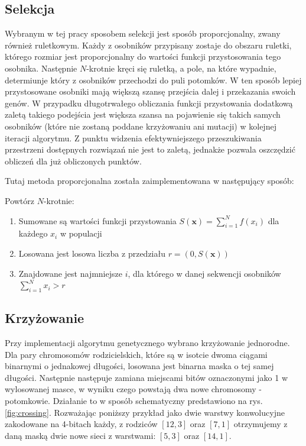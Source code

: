 \subsection{Selekcja}
Wybranym w tej pracy sposobem selekcji jest sposób proporcjonalny, zwany również ruletkowym.
Każdy z osobników przypisany zostaje do obszaru ruletki, którego rozmiar jest proporcjonalny do wartości funkcji przystosowania tego osobnika.
Następnie $N$-krotnie kręci się ruletką, a pole, na które wypadnie, determiunje który z osobników przechodzi do puli potomków.
W ten sposób lepiej przystosowane osobniki mają większą szansę przejścia dalej i przekazania swoich genów.
W przypadku długotrwałego obliczania funkcji przystowania dodatkową zaletą takiego podejścia jest większa szansa na pojawienie się takich samych osobników (które nie zostaną poddane krzyżowaniu ani mutacji) w kolejnej iteracji algorytmu.
Z punktu widzenia efektywniejszego przeszukiwania przestrzeni dostępnych rozwiązań nie jest to zaletą, jednakże pozwala oszczędzić obliczeń dla już obliczonych punktów.

Tutaj metoda proporcjonalna została zaimplementowana w następujący sposób:

Powtórz $N$-krotnie:
\begin{enumerate}
  \item Sumowane są wartości funkcji przystowania $S(\mathbf{x})=\sum_{i=1}^{N}f(x_i)$ dla każdego $x_i$ w populacji
  \item Losowana jest losowa liczba z przedziału $r = (0,S(\mathbf{x}))$
  \item Znajdowane jest najmniejsze $i$, dla którego w danej sekwencji osobników $\sum_{i=1}^{N}x_i > r $
\end{enumerate}

\subsection{Krzyżowanie}
Przy implementacji algorytmu genetycznego wybrano krzyżowanie jednorodne.
Dla pary chromosomów rodzicielskich, które są w isotcie dwoma ciągami binarnymi o jednakowej długości, losowana jest binarna maska o tej samej długości.
Następnie następuje zamiana miejscami bitów oznaczonymi jako 1 w wylosowanej masce, w wyniku czego powstają dwa nowe chromosomy - potomkowie.
Działanie to w sposób schematyczny predstawiono na rys. \ref{fig:crossing}.
Rozważając poniższy przykład jako dwie warstwy konwolucyjne zakodowane na 4-bitach każdy, z rodziców $[12,3]$ oraz $[7,1]$ otrzymujemy z daną maską dwie nowe sieci z warstwami: $[5,3]$ oraz $[14,1]$.

